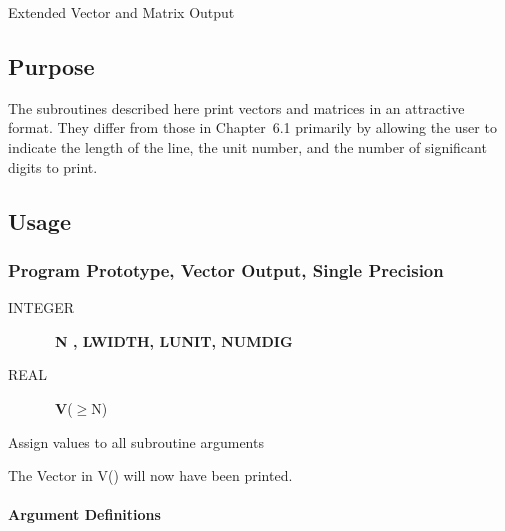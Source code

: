 \documentclass[twoside]{MATH77}
\begin{document}
  Extended Vector and Matrix Output


\subsection{Purpose}

The subroutines described here print vectors and matrices in an attractive
format. They differ from those in Chapter~6.1 primarily by allowing the user
to indicate the length of the line, the unit number, and the number of
significant digits to print.

\subsection{Usage}

\subsubsection{Program Prototype, Vector Output, Single Precision}

\begin{description}

\item[INTEGER] \ {\bf N , LWIDTH, LUNIT, NUMDIG}

\item[REAL] \ {\bf V}($\geq $N)

\end{description}

Assign values to all subroutine arguments

\begin{center}
\end{center}

The Vector in V() will now have been printed.

\paragraph{Argument Definitions}
\end{document}
